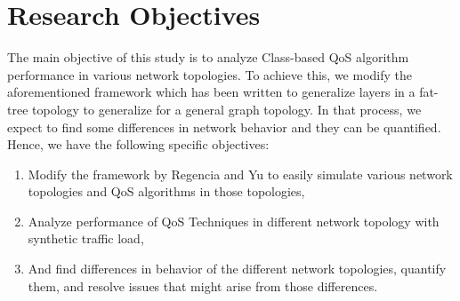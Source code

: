 \section{Research Objectives}

The main objective of this study is to analyze Class-based QoS algorithm performance in various network topologies. To achieve this, we modify the aforementioned framework which has been written to generalize layers in a fat-tree topology to generalize for a general graph topology. In that process, we expect to find some differences in network behavior and they can be quantified. Hence, we have the following specific objectives:

\begin{enumerate}
    \item Modify the framework by Regencia and Yu to easily simulate various network topologies and QoS algorithms in those topologies,
    \item Analyze performance of QoS Techniques in different network topology with synthetic traffic load,
    \item And find differences in behavior of the different network topologies, quantify them, and resolve issues that might arise from those differences.
\end{enumerate}

